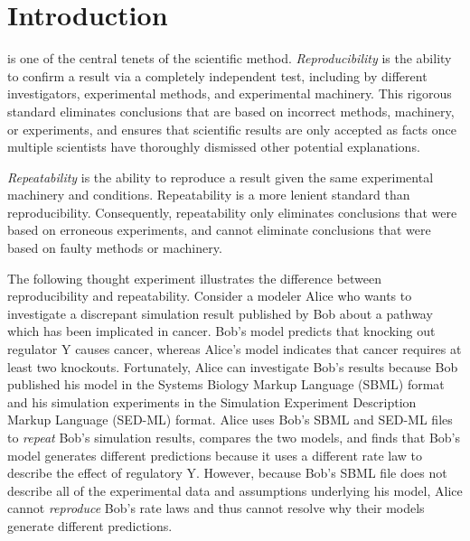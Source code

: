\documentclass[journal,transmag,twoside]{IEEEtran}
\begin{document}
\section{Introduction}
% 
% 
% 
% 
 is one of the central tenets of the scientific method.
\textit{Reproducibility} is the ability to confirm a result via a completely independent test, including by different investigators, experimental methods, and experimental machinery. 
This rigorous standard eliminates conclusions that are based on incorrect methods, machinery, or experiments, and ensures that scientific results are only accepted as facts once multiple scientists have thoroughly dismissed other potential explanations. 

\textit{Repeatability} is the ability to reproduce a result given the same experimental machinery and conditions.
Repeatability is a more lenient standard than reproducibility. 
Consequently, repeatability only eliminates conclusions that were based on erroneous experiments, and cannot eliminate conclusions that were based on faulty methods or machinery.

The following thought experiment illustrates the difference between reproducibility and repeatability. Consider a modeler Alice who wants to investigate a discrepant simulation result published by Bob about a pathway which has been implicated in cancer. Bob's model predicts that knocking out regulator Y causes cancer, whereas Alice's model indicates that cancer requires at least two knockouts. Fortunately, Alice can investigate Bob's results because Bob published his model in the Systems Biology Markup Language (SBML) \cite{hucka2003} format and his simulation experiments in the Simulation Experiment Description Markup Language (SED-ML) \cite{sedml2011} format. Alice uses Bob's SBML and SED-ML files to \textit{repeat} Bob's simulation results, compares the two models, and finds that Bob's model generates different predictions because it uses a different rate law to describe the effect of regulatory Y. However, because Bob's SBML file does not describe all of the experimental data and assumptions underlying his model, Alice cannot \textit{reproduce} Bob's rate laws and thus cannot resolve why their models generate different predictions.
\end{document}
